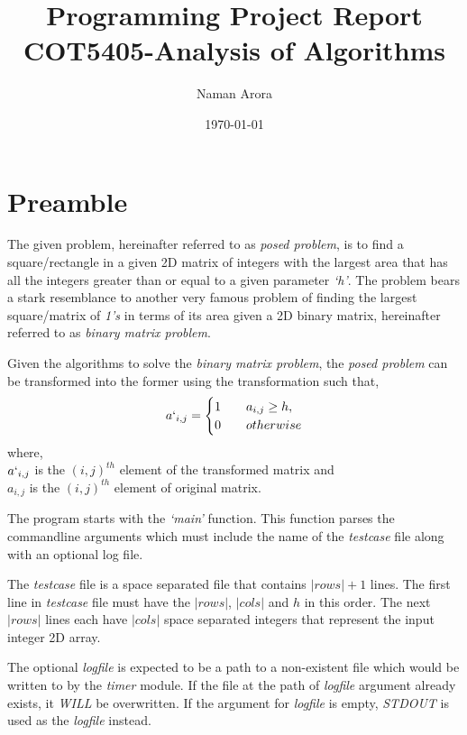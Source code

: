 \documentclass[10pt,a4paper]{article}
\title{%
        {\Huge Programming Project Report}\\
        {\Large COT5405-Analysis of Algorithms}
}
\author{Naman Arora}
\affil{UFID: 3979-0439}
\date{\today}
\begin{document}
\maketitle
\section*{Preamble}
The given problem, hereinafter referred to as \textit{posed problem}, is to find a square/rectangle in a given 2D matrix of integers with the largest area that has all the integers greater than or equal to a given parameter \textit{`h'}.
The problem bears a stark resemblance to another very famous problem of finding the largest square/matrix of \textit{1's} in terms of its area given a 2D binary matrix, hereinafter referred to as \textit{binary matrix problem}.

Given the algorithms to solve the \textit{binary matrix problem}, the \textit{posed problem} can be transformed into the former using the transformation such that,
\begin{equation} \label{trans}
        a`_{i, j} = \begin{cases}
                1 \quad & a_{i, j} \geq h,\\
                0 \quad & otherwise
        \end{cases}
\end{equation}
where,\\
$ a`_{i, j} $ is the $ (i, j)^{th} $ element of the transformed matrix and\\
$ a_{i, j} $ is the $ (i, j)^{th} $ element of original matrix.

The program starts with the \textit{`main'} function.
This function parses the commandline arguments which must include the name of the \textit{testcase} file along with an optional log file.

The \textit{testcase} file is a space separated file that contains $ |rows| + 1 $ lines.
The first line in \textit{testcase} file must have the $ |rows| $, $ |cols| $ and $ h $ in this order.
The next $ |rows| $ lines each have $ |cols| $ space separated integers that represent the input integer 2D array.

The optional \textit{logfile} is expected to be a path to a non-existent file which would be written to by the \textit{timer} module.
If the file at the path of \textit{logfile} argument already exists, it \textit{WILL} be overwritten.
If the argument for \textit{logfile} is empty, \textit{STDOUT} is used as the \textit{logfile} instead.
\end{document}
